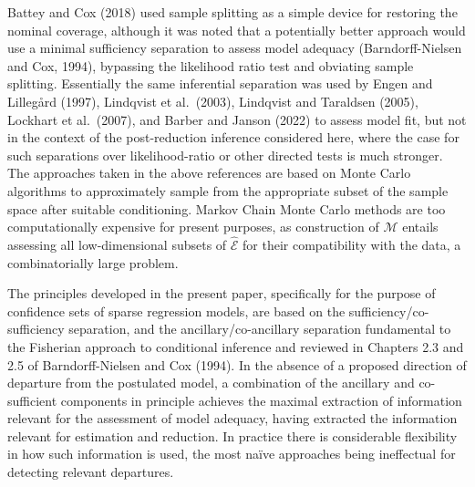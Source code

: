 \documentclass[10pt, reqno]{amsart}
\numberwithin{equation}{section}
\begin{document}
Battey and Cox (2018) used sample splitting as a simple device for restoring the nominal coverage, although it was noted that a potentially better approach would use a minimal sufficiency separation to assess model adequacy (Barndorff-Nielsen and Cox, 1994), bypassing the likelihood ratio test and obviating sample splitting. Essentially the same inferential separation was used by Engen and Lilleg{\aa}rd (1997), Lindqvist et al.~(2003), Lindqvist and Taraldsen (2005), Lockhart et al.~(2007), and Barber and Janson (2022) to assess model fit, but not in the context of the post-reduction inference considered here, where the case for such separations over likelihood-ratio or other directed tests is much stronger. The approaches taken in the above references are based on Monte Carlo algorithms to approximately sample from the appropriate subset of the sample space after suitable conditioning. Markov Chain Monte Carlo methods are too computationally expensive for present purposes, as construction of $\mathcal{M}$ entails assessing all low-dimensional subsets of $\hat{\mathcal{E}}$ for their compatibility with the data, a combinatorially large problem.  


The principles developed in the present paper, specifically for the purpose of confidence sets of sparse regression models, are based on the sufficiency/co-sufficiency separation, and the ancillary/co-ancillary separation fundamental to the Fisherian approach to conditional inference and reviewed in Chapters 2.3 and 2.5 of Barndorff-Nielsen and Cox (1994). In the absence of a proposed direction of departure from the postulated model, a combination of the ancillary and co-sufficient components in principle achieves the maximal extraction of information relevant for the assessment of model adequacy, having extracted the information relevant for estimation and reduction. In practice there is considerable flexibility in how such information is used, the most na{\"i}ve approaches being ineffectual for detecting relevant departures. 
\end{document}
